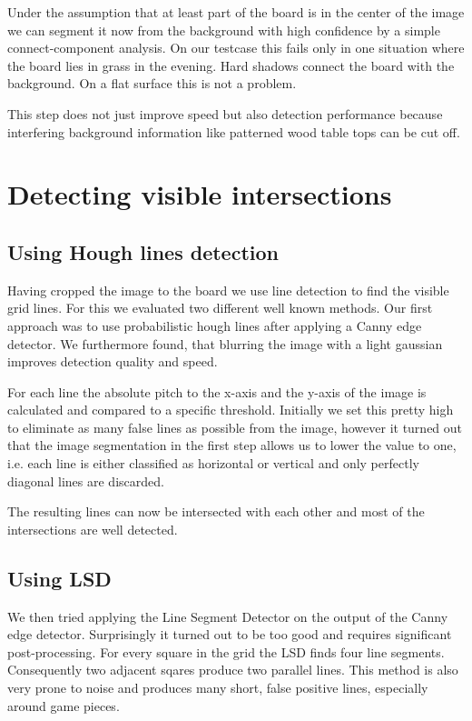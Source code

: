 	Under the assumption that at least part of the board is in the center of the image we can segment it now from the background with high confidence by a simple connect-component analysis. On our testcase this fails only in one situation where the board lies in grass in the evening. Hard shadows connect the board with the background. On a flat surface this is not a problem.

	This step does not just improve speed but also detection performance because interfering background information like patterned wood table tops can be cut off.

	\section{Detecting visible intersections}
	\subsection{Using Hough lines detection}
	Having cropped the image to the board we use line detection to find the visible grid lines. For this we evaluated two different well known methods. Our first approach was to use probabilistic hough lines after applying a Canny edge detector. We furthermore found, that blurring the image with a light gaussian improves detection quality and speed.

	For each line the absolute pitch to the x-axis and the y-axis of the image is calculated and compared to a specific threshold. Initially we set this pretty high to eliminate as many false lines as possible from the image, however it turned out that the image segmentation in the first step allows us to lower the value to one, i.e. each line is either classified as horizontal or vertical and only perfectly diagonal lines are discarded.

	The resulting lines can now be intersected with each other and most of the intersections are well detected.
	\\

	\subsection{Using LSD}
	We then tried applying the Line Segment Detector \cite{} on the output of the Canny edge detector. Surprisingly it turned out to be too good and requires significant post-processing. For every square in the grid the LSD finds four line segments. Consequently two adjacent sqares produce two parallel lines. This method is also very prone to noise and produces many short, false positive lines, especially around game pieces.

